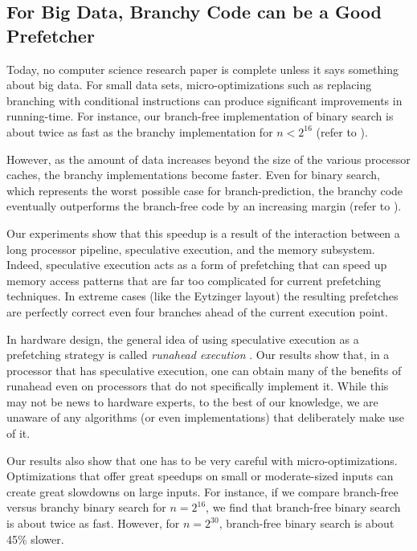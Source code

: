 \documentclass{patmorin}
\begin{document}
\subsection{For Big Data, Branchy Code can be a Good Prefetcher}

Today, no computer science research paper is complete unless it says
something about big data.  For small data sets, micro-optimizations
such as replacing branching with conditional instructions can produce
significant improvements in running-time.  For instance, our branch-free
implementation of binary search is about twice as fast as the branchy
implementation for $n<2^{16}$ (refer to ).

However, as the amount of data increases beyond the size of the
various processor caches, the branchy implementations become faster.
Even for binary search, which represents the worst possible case for
branch-prediction, the branchy code eventually outperforms the branch-free
code by an increasing margin (refer to ).

Our experiments show that this speedup is a result of the interaction
between a long processor pipeline, speculative execution, and the memory
subsystem.  Indeed, speculative execution acts as a form of prefetching
that can speed up memory access patterns that are far too complicated
for current prefetching techniques.  In extreme cases (like the Eytzinger
layout) the resulting prefetches are perfectly correct even four branches
ahead of the current execution point.

In hardware design, the general idea of using speculative execution
as a prefetching strategy is called \emph{runahead execution}
\cite{mutlu.stark.ea:runahead}.  Our results show that, in a processor
that has speculative execution, one can obtain many of the benefits
of runahead even on processors that do not specifically implement it.
While this may not be news to hardware experts, to the best of our
knowledge, we are unaware of any algorithms (or even implementations)
that deliberately make  use of it.

Our results also show
that one has to be very careful with
micro-optimizations.  Optimizations that offer great speedups on small
or moderate-sized inputs can create great slowdowns on large inputs.
For instance, if we compare branch-free versus branchy binary search for
$n=2^{16}$, we find that branch-free binary search is about twice as fast.
However, for $n=2^{30}$, branch-free binary search is about 45\% slower.
\end{document}

